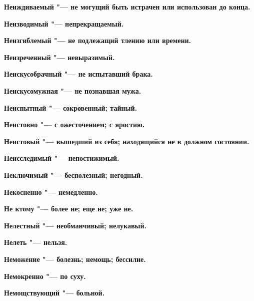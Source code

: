 \begin{mymulticols}{2}
\bfseries Неиждиваемый\normalfont{} "--- не могущий быть истрачен или использован до конца. 




\bfseries Неизводимый\normalfont{} "--- непрекращаемый. 




\bfseries Неизгиблемый\normalfont{} "--- не подлежащий тлению или времени. 




\bfseries Неизреченный\normalfont{} "--- невыразимый. 




\bfseries Неискусобрачный\normalfont{} "--- не испытавший брака. 




\bfseries Неискусомужная\normalfont{} "--- не познавшая мужа. 




\bfseries Неиспытный\normalfont{} "--- сокровенный; тайный. 




\bfseries Неистовно\normalfont{} "--- с ожесточением; с яростию. 




\bfseries Неистовый\normalfont{} "--- вышедший из себя; находящийся не в должном состоянии. 




\bfseries Неисследимый\normalfont{} "--- непостижимый. 




\bfseries Неключимый\normalfont{} "--- бесполезный; негодный. 




\bfseries Некосненно\normalfont{} "--- немедленно. 




\bfseries Не ктому\normalfont{} "--- более не; еще не; уже не. 




\bfseries Нелестный\normalfont{} "--- необманчивый; нелукавый. 




\bfseries Нелеть\normalfont{} "--- нельзя. 




\bfseries Неможение\normalfont{} "--- болезнь; немощь; бессилие. 




\bfseries Немокренно\normalfont{} "--- по суху. 




\bfseries Немощствующий\normalfont{} "--- больной. 





\end{mymulticols}
